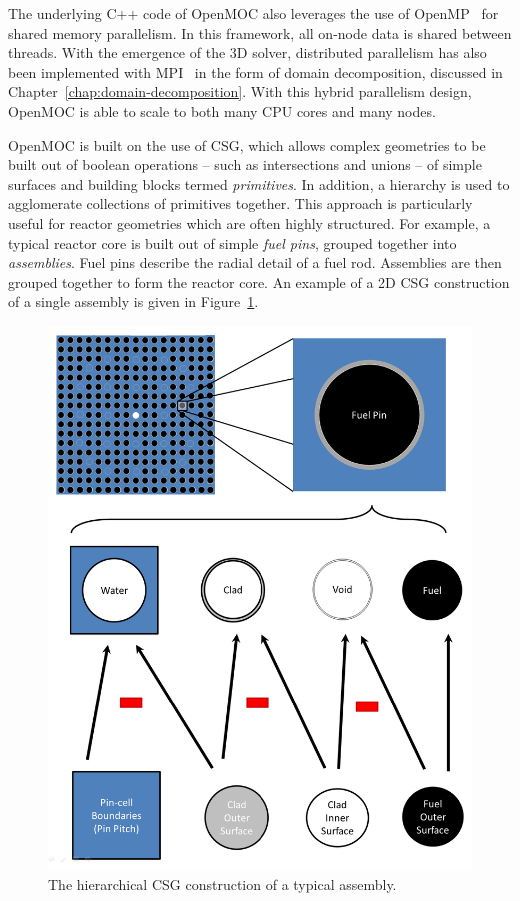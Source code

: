 The underlying C++ code of OpenMOC also leverages the use of OpenMP~\cite{openmp} for shared memory parallelism. In this framework, all on-node data is shared between threads. With the emergence of the 3D solver, distributed parallelism has also been implemented with MPI~\cite{mpi} in the form of domain decomposition, discussed in Chapter~\ref{chap:domain-decomposition}. With this hybrid parallelism design, OpenMOC is able to scale to both many CPU cores and many nodes. 

OpenMOC is built on the use of \ac{CSG}, which allows complex geometries to be built out of boolean operations -- such as intersections and unions -- of simple surfaces and building blocks termed \textit{primitives}. In addition, a hierarchy is used to agglomerate collections of primitives together. This approach is particularly useful for reactor geometries which are often highly structured. For example, a typical reactor core is built out of simple \textit{fuel pins}, grouped together into \textit{assemblies}. Fuel pins describe the radial detail of a fuel rod. Assemblies are then grouped together to form the reactor core. An example of a 2D \ac{CSG} construction of a single assembly is given in Figure~\ref{fig:core-csg}.

\begin{figure}[h!]
	\centering
	\includegraphics[width=0.9\linewidth]{figures/assembly-csg.PNG}
	\caption[]{The hierarchical CSG construction of a typical assembly.}
	\label{fig:core-csg}
\end{figure}


